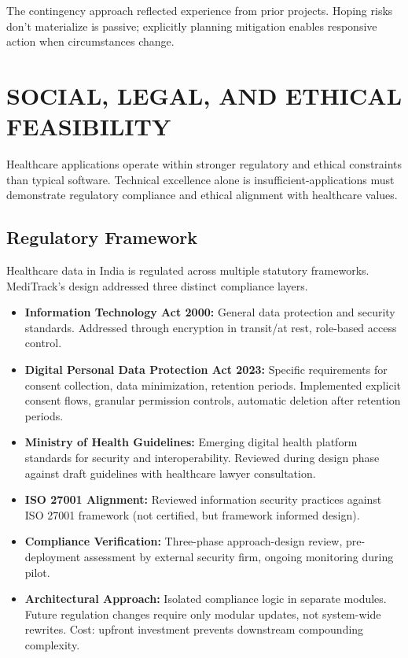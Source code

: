 \documentclass[12pt,a4paper]{report}
\begin{document}
The contingency approach reflected experience from prior projects. Hoping risks don't materialize is passive; explicitly planning mitigation enables responsive action when circumstances change.

\section{SOCIAL, LEGAL, AND ETHICAL FEASIBILITY}

Healthcare applications operate within stronger regulatory and ethical constraints than typical software. Technical excellence alone is insufficient-applications must demonstrate regulatory compliance and ethical alignment with healthcare values.

\subsection{Regulatory Framework}

Healthcare data in India is regulated across multiple statutory frameworks. MediTrack's design addressed three distinct compliance layers.

\begin{itemize}
  \item \textbf{Information Technology Act 2000:} General data protection and security standards. Addressed through encryption in transit/at rest, role-based access control.

  \item \textbf{Digital Personal Data Protection Act 2023:} Specific requirements for consent collection, data minimization, retention periods. Implemented explicit consent flows, granular permission controls, automatic deletion after retention periods.

  \item \textbf{Ministry of Health Guidelines:} Emerging digital health platform standards for security and interoperability. Reviewed during design phase against draft guidelines with healthcare lawyer consultation.

  \item \textbf{ISO 27001 Alignment:} Reviewed information security practices against ISO 27001 framework (not certified, but framework informed design).

  \item \textbf{Compliance Verification:} Three-phase approach-design review, pre-deployment assessment by external security firm, ongoing monitoring during pilot.

  \item \textbf{Architectural Approach:} Isolated compliance logic in separate modules. Future regulation changes require only modular updates, not system-wide rewrites. Cost: upfront investment prevents downstream compounding complexity.
\end{itemize}
\end{document}
